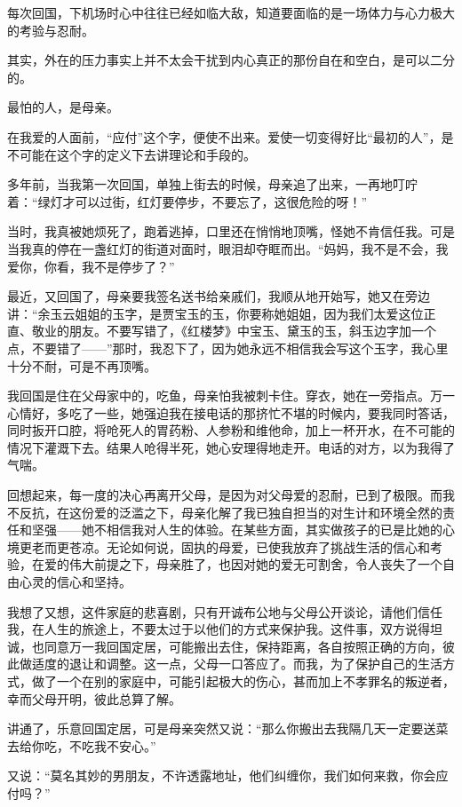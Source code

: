 \par 每次回国，下机场时心中往往已经如临大敌，知道要面临的是一场体力与心力极大的考验与忍耐。
\par 其实，外在的压力事实上并不太会干扰到内心真正的那份自在和空白，是可以二分的。
\par 最怕的人，是母亲。
\par 在我爱的人面前，“应付”这个字，便使不出来。爱使一切变得好比“最初的人”，是不可能在这个字的定义下去讲理论和手段的。
\par 多年前，当我第一次回国，单独上街去的时候，母亲追了出来，一再地叮咛着：“绿灯才可以过街，红灯要停步，不要忘了，这很危险的呀！”
\par 当时，我真被她烦死了，跑着逃掉，口里还在悄悄地顶嘴，怪她不肯信任我。可是当我真的停在一盏红灯的街道对面时，眼泪却夺眶而出。“妈妈，我不是不会，我爱你，你看，我不是停步了？”
\par 最近，又回国了，母亲要我签名送书给亲戚们，我顺从地开始写，她又在旁边讲：“余玉云姐姐的玉字，是贾宝玉的玉，你要称她姐姐，因为我们太爱这位正直、敬业的朋友。不要写错了，《红楼梦》中宝玉、黛玉的玉，斜玉边字加一个点，不要错了——”那时，我忍下了，因为她永远不相信我会写这个玉字，我心里十分不耐，可是不再顶嘴。
\par 我回国是住在父母家中的，吃鱼，母亲怕我被刺卡住。穿衣，她在一旁指点。万一心情好，多吃了一些，她强迫我在接电话的那挤忙不堪的时候内，要我同时答话，同时扳开口腔，将呛死人的胃药粉、人参粉和维他命，加上一杯开水，在不可能的情况下灌溉下去。结果人呛得半死，她心安理得地走开。电话的对方，以为我得了气喘。
\par 回想起来，每一度的决心再离开父母，是因为对父母爱的忍耐，已到了极限。而我不反抗，在这份爱的泛滥之下，母亲化解了我已独自担当的对生计和环境全然的责任和坚强——她不相信我对人生的体验。在某些方面，其实做孩子的已是比她的心境更老而更苍凉。无论如何说，固执的母爱，已使我放弃了挑战生活的信心和考验，在爱的伟大前提之下，母亲胜了，也因对她的爱无可割舍，令人丧失了一个自由心灵的信心和坚持。
\par 我想了又想，这件家庭的悲喜剧，只有开诚布公地与父母公开谈论，请他们信任我，在人生的旅途上，不要太过于以他们的方式来保护我。这件事，双方说得坦诚，也同意万一我回国定居，可能搬出去住，保持距离，各自按照正确的方向，彼此做适度的退让和调整。这一点，父母一口答应了。而我，为了保护自己的生活方式，做了一个在别的家庭中，可能引起极大的伤心，甚而加上不孝罪名的叛逆者，幸而父母开明，彼此总算了解。
\par 讲通了，乐意回国定居，可是母亲突然又说：“那么你搬出去我隔几天一定要送菜去给你吃，不吃我不安心。”
\par 又说：“莫名其妙的男朋友，不许透露地址，他们纠缠你，我们如何来救，你会应付吗？”
